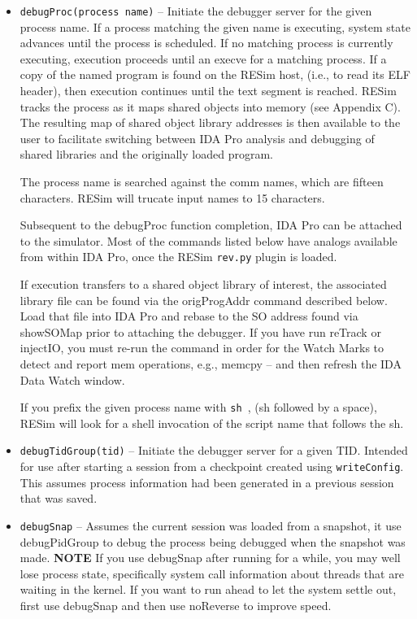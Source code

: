 \documentclass[titlepage]{article}
\begin{document}
\begin{itemize}

\item {\tt debugProc(process name)} – Initiate the debugger server for the given process name.  If a process matching the given name is executing, system state advances until the process is scheduled.  If no matching process is currently executing, execution proceeds until an execve for a matching process.   If a copy of the named program is found on the RESim host, (i.e., to read its ELF header), then execution continues until the text segment is reached.  RESim tracks the process as it maps shared objects into memory (see Appendix C).  The resulting map of shared object library addresses is then available to the user to facilitate switching between IDA Pro analysis and debugging of shared libraries and the originally loaded program.

The process name is searched against the comm names, which are fifteen characters.  RESim will trucate input names to 15 characters.
                                                               

Subsequent to the debugProc  function completion, IDA Pro can be attached to the simulator.  Most of the commands listed below have analogs available from within IDA Pro, once the RESim {\tt rev.py} plugin is loaded.

If execution transfers to a shared object library of interest, the associated library file can be found via the origProgAddr command described below.  Load that file into IDA Pro and rebase to the SO address
found via showSOMap prior to attaching the debugger.  If you have run reTrack or injectIO, you must re-run the command in order for the Watch Marks to 
detect and report mem operations, e.g., memcpy -- and then refresh the IDA Data Watch window. 

If you prefix the given process name with {\tt sh }, (sh followed by a space), RESim will look for a shell invocation of the script name that follows the sh.

\item {\tt debugTidGroup(tid)} -- Initiate the debugger server for a given TID.  Intended for use after starting a session from a checkpoint created using
{\tt writeConfig}.  This assumes process information had been generated in a previous session that was saved.  

\item {\tt debugSnap} -- Assumes the current session was loaded from a snapshot, it use debugPidGroup to debug the process being debugged when the snapshot was made.
\textbf{NOTE} If you use debugSnap after running for a while, you may well lose process state, specifically system call information about 
threads that are waiting in the kernel.  If you want to run ahead to let the system settle out, first use debugSnap and then use noReverse to improve speed.


\end{itemize}
\end{document}
